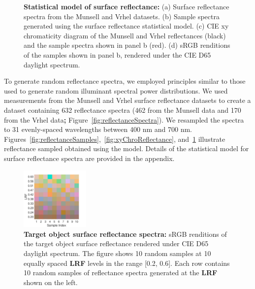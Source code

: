 \documentclass{jov}
\providecommand{\DIFaddtex}[1]{{\bf #1}} %
\providecommand{\DIFdeltex}[1]{} %
\providecommand{\DIFaddbegin}{} %
\providecommand{\DIFaddend}{} %
\providecommand{\DIFdelbegin}{} %
\providecommand{\DIFdelend}{} %
\providecommand{\DIFaddFL}[1]{\DIFadd{#1}} %
\providecommand{\DIFdelFL}[1]{\DIFdel{#1}} %
\providecommand{\DIFaddbeginFL}{} %
\providecommand{\DIFaddendFL}{} %
\providecommand{\DIFdelbeginFL}{} %
\providecommand{\DIFdelendFL}{} %
\providecommand{\DIFadd}[1]{\texorpdfstring{\DIFaddtex{#1}}{#1}} %
\providecommand{\DIFdel}[1]{\texorpdfstring{\DIFdeltex{#1}}{}} %
\newcommand{\DIFscaledelfig}{0.5}
\newlength{\DIFdelgraphicswidth} %
\newlength{\DIFdelgraphicsheight} %
\newcommand{\DIFaddincludegraphics}[2][]{{\color{blue}\fbox{\DIFOincludegraphics[#1]{#2}}}} %
\newcommand{\DIFdelincludegraphics}[2][]{%
\sbox{\DIFdelgraphicsbox}{\DIFOincludegraphics[#1]{#2}}%
\settoboxwidth{\DIFdelgraphicswidth}{\DIFdelgraphicsbox} %
\settoboxtotalheight{\DIFdelgraphicsheight}{\DIFdelgraphicsbox} %
\scalebox{\DIFscaledelfig}{%
\parbox[b]{\DIFdelgraphicswidth}{\usebox{\DIFdelgraphicsbox}\\[-\baselineskip] \rule{\DIFdelgraphicswidth}{0em}}\llap{\resizebox{\DIFdelgraphicswidth}{\DIFdelgraphicsheight}{%
\setlength{\unitlength}{\DIFdelgraphicswidth}%
\begin{picture}(1,1)%
\thicklines\linethickness{2pt} %
{\color[rgb]{1,0,0}\put(0,0){\framebox(1,1){}}}%
{\color[rgb]{1,0,0}\put(0,0){\line( 1,1){1}}}%
{\color[rgb]{1,0,0}\put(0,1){\line(1,-1){1}}}%
\end{picture}%
}\hspace*{3pt}}} %
} %
\DeclareRobustCommand{\DIFaddbegin}{\DIFOaddbegin \let\includegraphics\DIFaddincludegraphics} %
\DeclareRobustCommand{\DIFaddend}{\DIFOaddend \let\includegraphics\DIFOincludegraphics} %
\DeclareRobustCommand{\DIFdelbegin}{\DIFOdelbegin \let\includegraphics\DIFdelincludegraphics} %
\DeclareRobustCommand{\DIFdelend}{\DIFOaddend \let\includegraphics\DIFOincludegraphics} %
\DeclareRobustCommand{\DIFaddbeginFL}{\DIFOaddbeginFL \let\includegraphics\DIFaddincludegraphics} %
\DeclareRobustCommand{\DIFaddendFL}{\DIFOaddendFL \let\includegraphics\DIFOincludegraphics} %
\DeclareRobustCommand{\DIFdelbeginFL}{\DIFOdelbeginFL \let\includegraphics\DIFdelincludegraphics} %
\DeclareRobustCommand{\DIFdelendFL}{\DIFOaddendFL \let\includegraphics\DIFOincludegraphics} %
\begin{document}
\begin{figure}
\begin{subfigure}{0.24 \textwidth}
        \label{fig:backgroundSwatches}
    \end{subfigure}
    \caption{{\bf Statistical model of surface reflectance:} (a) Surface reflectance spectra from the Munsell and Vrhel datasets. (b) Sample spectra generated using the surface reflectance statistical model. (c) CIE xy chromaticity diagram of the Munsell and Vrhel reflectances (black) and the sample spectra shown in panel b (red). (d) sRGB renditions of the samples shown in panel b, rendered under the CIE D65 daylight spectrum.}
\label{fig:surfaceReflectanceGeneration}
\end{figure}

To generate random reflectance spectra, we employed principles similar to those used to generate random illuminant spectral power distributions.
We used measurements from the Munsell \cite{kelly1943tristimulus} and Vrhel \cite{vrhel1994measurement} surface reflectance datasets to create a dataset containing 632 reflectance spectra (462 from the Munsell data and 170 from the Vrhel data\DIFdelbegin \DIFdel{) (}\DIFdelend \DIFaddbegin \DIFadd{; }\DIFaddend Figure~\ref{fig:reflectanceSpectra}).
We resampled the spectra to 31 evenly-spaced wavelengths between 400 nm and 700 nm.
Figures~\ref{fig:reflectanceSamples},~\ref{fig:xyChroReflectance}, and~\ref{fig:backgroundSwatches} illustrate reflectance sampled obtained using the model. 
Details of the statistical model for surface reflectance spectra are provided in the appendix. 

\begin{figure}
\centering
\includegraphics[width=0.3\textwidth]{../FiguresDraft5/Figure8/Figure8.pdf}
\caption{{\bf Target object surface reflectance spectra:} sRGB renditions of the target object surface reflectance rendered under CIE D65 daylight spectrum. The figure shows 10 random samples at 10 equally spaced \DIFdelbeginFL \DIFdelFL{LRV }\DIFdelendFL \DIFaddbeginFL \DIFaddFL{LRF }\DIFaddendFL levels in the range [0.2, 0.6]. Each row contains 10 random samples of reflectance spectra generated at the \DIFdelbeginFL \DIFdelFL{LRV }\DIFdelendFL \DIFaddbeginFL \DIFaddFL{LRF }\DIFaddendFL shown on the left.}
\label{fig:targetSwatches}
\end{figure}
\end{document}

